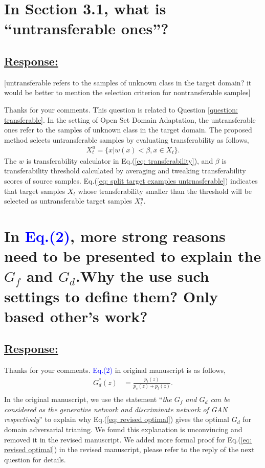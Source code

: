 \section{In Section 3.1, what is ``untransferable ones''?}
\subsection*{\underline{\textbf{Response:}}}

\textcolor[rgb]{1.00,0.00,0.00}{[untransferable refers to the samples of unknown class in the target domain? it would be better to mention the selection criterion for nontransferable samples]}

Thanks for your comments.
This question is related to Question \ref{question: transferable}.
In the setting of Open Set Domain Adaptation, the untransferable ones refer to the samples of unknown class in the target domain.
The proposed method selects untransferable samples by evaluating transferability as follows,
\begin{equation}
    \label{eq: split target examples untrnasferable}
    \begin{split}
        X_t^u=\{x|w(x) < \beta, x \in X_t \}.
    \end{split}
\end{equation}
The $w$ is transferability calculator in Eq.(\ref{eq: transferability}), and $\beta$ is transferability threshold calculated by averaging and tweaking transferability scores of source samples.
Eq.(\ref{eq: split target examples untrnasferable}) indicates that target samples  $X_t$ whose transferability smaller than the threshold will be selected as untransferable target samples $X_t^u$. 

\section{In \textcolor{blue}{Eq.(2)}, more strong reasons need to be presented to explain the $G_f$ and $G_d$.Why the use such settings to define them? Only based other's work?}
\subsection*{\underline{\textbf{Response:}}}

Thanks for your comments.
\textcolor{blue}{Eq.(2)} in original manuscript is as follows,
\begin{equation}
    \label{eq: revised optimal}
    \begin{split}
        G_d^*(z) &= \frac{p_t(z)}{p_s(z)+p_t(z)}. \\
    \end{split}
\end{equation}
In the original manuscript, we use the statement ``\textit{the $G_f$ and $G_d$ can be considered as the generative network and discriminate network of GAN respectively}'' to explain why Eq.(\ref{eq: revised optimal}) gives the optimal $G_d$ for domain adversarial trianing.
We found this explanation is unconvincing and removed it in the revised manuscript.
We added more formal proof for Eq.(\ref{eq: revised optimal}) in the revised manuscript, please refer to the reply of the next question for details.


